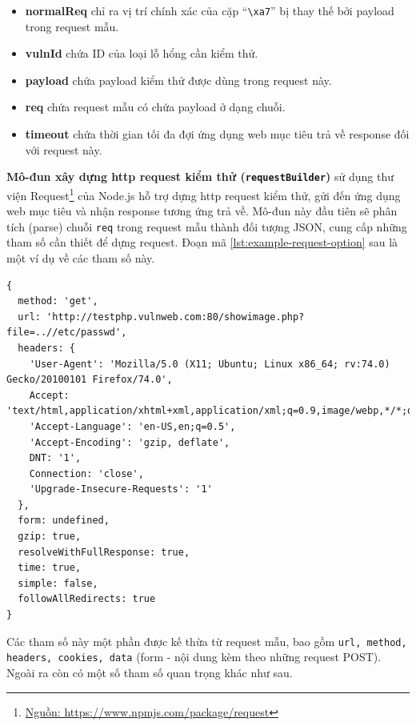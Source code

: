 \begin{itemize}
    \item \textbf{normalReq} chỉ ra vị trí chính xác của cặp ``\texttt{\textbackslash xa7}'' bị thay thế bởi payload trong request mẫu.
    \item \textbf{vulnId} chứa ID của loại lỗ hổng cần kiểm thử.
    \item \textbf{payload} chứa payload kiểm thử được dùng trong request này.
    \item \textbf{req} chứa request mẫu có chứa payload ở dạng chuỗi.
    \item \textbf{timeout} chứa thời gian tối đa đợi ứng dụng web mục tiêu trả về response đối với request này.
\end{itemize}
\textbf{Mô-đun xây dựng \acrshort{http} request kiểm thử (\texttt{requestBuilder})} sử dụng thư viện Request\footnote{\href{https://www.npmjs.com/package/request}{Nguồn: https://www.npmjs.com/package/request}} của Node.js hỗ trợ dựng \acrshort{http} request kiểm thử, gửi đến ứng dụng web mục tiêu và nhận response tương ứng trả về. Mô-đun này đầu tiên sẽ phân tích (parse) chuỗi \texttt{req} trong request mẫu thành đối tượng JSON, cung cấp những tham số cần thiết để dựng request. Đoạn mã \ref{lst:example-request-option} sau là một ví dụ về các tham số này.
\begin{lstlisting}[style=ES6, label={lst:example-request-option}, caption={Ví dụ về tham số xây dựng request kiểm thử}]
{ 
  method: 'get',
  url: 'http://testphp.vulnweb.com:80/showimage.php?file=..//etc/passwd',
  headers: { 
    'User-Agent': 'Mozilla/5.0 (X11; Ubuntu; Linux x86_64; rv:74.0) Gecko/20100101 Firefox/74.0',
    Accept: 'text/html,application/xhtml+xml,application/xml;q=0.9,image/webp,*/*;q=0.8',
    'Accept-Language': 'en-US,en;q=0.5',
    'Accept-Encoding': 'gzip, deflate',
    DNT: '1',
    Connection: 'close',
    'Upgrade-Insecure-Requests': '1' 
  },
  form: undefined,
  gzip: true,
  resolveWithFullResponse: true,
  time: true,
  simple: false,
  followAllRedirects: true
}
\end{lstlisting}
Các tham số này một phần được kế thừa từ request mẫu, bao gồm \texttt{url, method, headers, cookies, data} (form - nội dung kèm theo những request POST). Ngoài ra còn có một số tham số quan trọng khác như sau.
